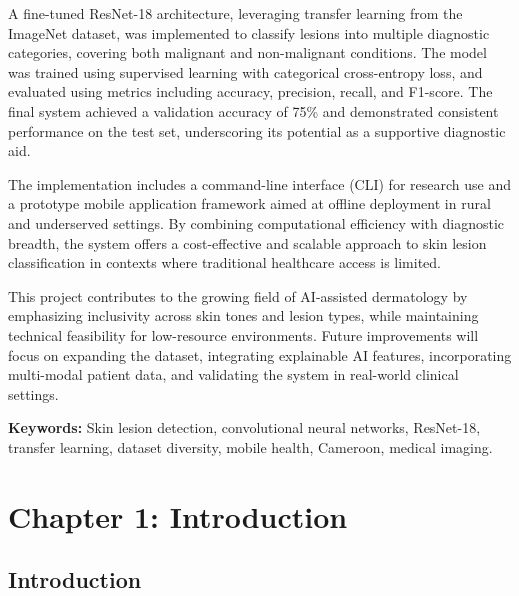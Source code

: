 \documentclass[
  12pt,
  oneside]{article}
\begin{document}
A fine-tuned ResNet-18 architecture, leveraging transfer learning from the ImageNet dataset, was implemented to classify lesions into multiple diagnostic categories, covering both malignant and non-malignant conditions. The model was trained using supervised learning with categorical cross-entropy loss, and evaluated using metrics including accuracy, precision, recall, and F1-score. The final system achieved a validation accuracy of 75\% and demonstrated consistent performance on the test set, underscoring its potential as a supportive diagnostic aid.

The implementation includes a command-line interface (CLI) for research use and a prototype mobile application framework aimed at offline deployment in rural and underserved settings. By combining computational efficiency with diagnostic breadth, the system offers a cost-effective and scalable approach to skin lesion classification in contexts where traditional healthcare access is limited. 

This project contributes to the growing field of AI-assisted dermatology by emphasizing inclusivity across skin tones and lesion types, while maintaining technical feasibility for low-resource environments. Future improvements will focus on expanding the dataset, integrating explainable AI features, incorporating multi-modal patient data, and validating the system in real-world clinical settings.

\vspace{1cm}
\noindent\textbf{Keywords:} Skin lesion detection, convolutional neural networks, ResNet-18, transfer learning, dataset diversity, mobile health, Cameroon, medical imaging.

\vfill
\clearpage

{
\setcounter{tocdepth}{3}
\tableofcontents
}
\newpage

\listoffigures
\newpage

\newpage

\section{Chapter 1: Introduction}\label{chapter-1-introduction}

\subsection{Introduction}\label{introduction}
\end{document}
